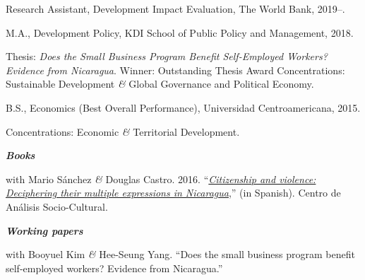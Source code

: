 \documentclass[11pt,article,oneside, a4paper]{memoir}
\begin{document}
{}

\ind Research Assistant, Development Impact Evaluation, The World Bank, 2019--.

\medskip

\ind M.A., Development Policy, KDI School of Public Policy and Management, 2018. 

\ind \hspace{0.35in} \footnotesize Thesis: \emph{Does the Small Business Program Benefit Self-Employed Workers? Evidence from Nicaragua}. \newline Winner: Outstanding Thesis Award \newline Concentrations: Sustainable Development \textit{\&} Global Governance and Political Economy. \normalsize \vspace{0.01in}

\ind B.S., Economics (Best Overall Performance), Universidad Centroamericana, 2015.

\ind \hspace{0.35in} \footnotesize Concentrations: Economic \textit{\&} Territorial Development. \normalsize \vspace{0.01in}

\medskip

\noindent\emph{\textbf{Books} \vspace{0.01in}}

\ind with Mario Sánchez \textit{\&} Douglas Castro. 2016. ``\emph{\href{http://biblioteca.clacso.edu.ar/Nicaragua/casc-uca/20150313124733/Ciudadania-y-violencia.pdf}{Citizenship and violence: Deciphering their multiple expressions in Nicaragua}},'' (in Spanish). Centro de Análisis Socio-Cultural. \vspace{0.05in} \normalsize

\medskip
\noindent\emph{\textbf{Working papers} \vspace{0.05in}}

\ind with Booyuel Kim \textit{\&} Hee-Seung Yang. ``Does the small business program benefit self-employed workers? Evidence from Nicaragua.''
\end{document}
